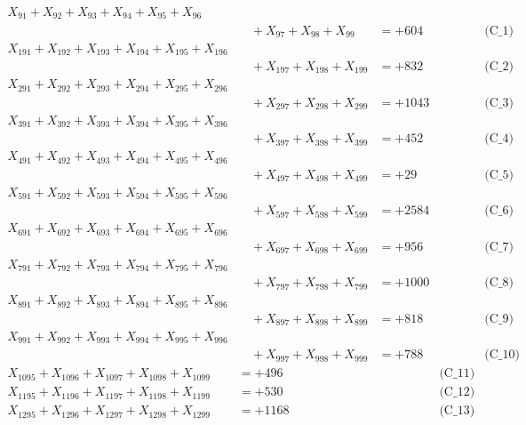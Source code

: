 \documentclass[a4paper,10pt]{article}
\begin{document}
\allowdisplaybreaks
{\small
\begin{align}
X_{91} + X_{92} + X_{93} + X_{94} + X_{95} + X_{96} \\[0.1ex]
&\quad  + X_{97} + X_{98} + X_{99} &= +604 && \text{(C\_1)} \\
X_{191} + X_{192} + X_{193} + X_{194} + X_{195} + X_{196} \\[0.1ex]
&\quad  + X_{197} + X_{198} + X_{199} &= +832 && \text{(C\_2)} \\
X_{291} + X_{292} + X_{293} + X_{294} + X_{295} + X_{296} \\[0.1ex]
&\quad  + X_{297} + X_{298} + X_{299} &= +1043 && \text{(C\_3)} \\
X_{391} + X_{392} + X_{393} + X_{394} + X_{395} + X_{396} \\[0.1ex]
&\quad  + X_{397} + X_{398} + X_{399} &= +452 && \text{(C\_4)} \\
X_{491} + X_{492} + X_{493} + X_{494} + X_{495} + X_{496} \\[0.1ex]
&\quad  + X_{497} + X_{498} + X_{499} &= +29 && \text{(C\_5)} \\
\allowbreak
X_{591} + X_{592} + X_{593} + X_{594} + X_{595} + X_{596} \\[0.1ex]
&\quad  + X_{597} + X_{598} + X_{599} &= +2584 && \text{(C\_6)} \\
X_{691} + X_{692} + X_{693} + X_{694} + X_{695} + X_{696} \\[0.1ex]
&\quad  + X_{697} + X_{698} + X_{699} &= +956 && \text{(C\_7)} \\
X_{791} + X_{792} + X_{793} + X_{794} + X_{795} + X_{796} \\[0.1ex]
&\quad  + X_{797} + X_{798} + X_{799} &= +1000 && \text{(C\_8)} \\
X_{891} + X_{892} + X_{893} + X_{894} + X_{895} + X_{896} \\[0.1ex]
&\quad  + X_{897} + X_{898} + X_{899} &= +818 && \text{(C\_9)} \\
X_{991} + X_{992} + X_{993} + X_{994} + X_{995} + X_{996} \\[0.1ex]
&\quad  + X_{997} + X_{998} + X_{999} &= +788 && \text{(C\_10)} \\
\allowbreak
X_{1095} + X_{1096} + X_{1097} + X_{1098} + X_{1099} &= +496 && \text{(C\_11)} \\
X_{1195} + X_{1196} + X_{1197} + X_{1198} + X_{1199} &= +530 && \text{(C\_12)} \\
X_{1295} + X_{1296} + X_{1297} + X_{1298} + X_{1299} &= +1168 && \text{(C\_13)} \\

\end{align}}
\end{document}
